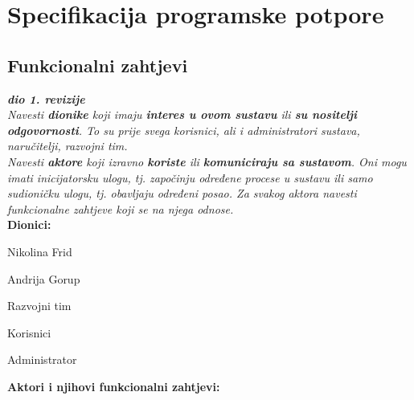 \chapter{Specifikacija programske potpore}
		
	\section{Funkcionalni zahtjevi}
			
			\textbf{\textit{dio 1. revizije}}\\
			
			\textit{Navesti \textbf{dionike} koji imaju \textbf{interes u ovom sustavu} ili  \textbf{su nositelji odgovornosti}. To su prije svega korisnici, ali i administratori sustava, naručitelji, razvojni tim.}\\
				
			\textit{Navesti \textbf{aktore} koji izravno \textbf{koriste} ili \textbf{komuniciraju sa sustavom}. Oni mogu imati inicijatorsku ulogu, tj. započinju određene procese u sustavu ili samo sudioničku ulogu, tj. obavljaju određeni posao. Za svakog aktora navesti funkcionalne zahtjeve koji se na njega odnose.}\\
			
			
			\noindent \textbf{Dionici:}
			
			\begin{packed_enum}
				
				\item Nikolina Frid
				\item Andrija Gorup 
				\item Razvojni tim
				\item Korisnici
				\item Administrator
				
			\end{packed_enum}
			
			\noindent \textbf{Aktori i njihovi funkcionalni zahtjevi:}
			
